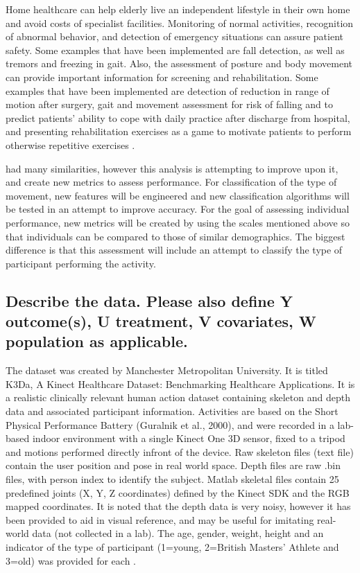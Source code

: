 \documentclass[twoside,11pt]{article}
\begin{document}
 	Home healthcare can help elderly live an independent lifestyle in their own home and avoid costs of specialist facilities.	Monitoring of normal activities, recognition of abnormal behavior, and detection of emergency situations can assure patient safety. Some examples that have been implemented are fall detection, as well as tremors and freezing in gait. Also, the assessment of posture and body movement can provide important information for screening and rehabilitation. Some examples that have been implemented are detection of reduction in range of motion after surgery, gait and movement assessment for risk of falling and to predict patients' ability to cope with daily practice after discharge from hospital, and presenting rehabilitation exercises as a game to motivate patients to perform otherwise repetitive exercises \citep{cite1}. 
 	
  \citep{cite1} had many similarities, however this analysis is attempting to improve upon it, and create new metrics to assess performance. For classification of the type of movement, new features will be engineered and new classification algorithms will be tested in an attempt to improve accuracy. For the goal of assessing individual performance, new metrics will be created by using the scales mentioned above so that individuals can be compared to those of similar demographics. The biggest difference is that this assessment will include an attempt to classify the type of participant performing the activity.

\subsection{Describe the data. Please also define Y outcome(s), U treatment, V covariates, W population as applicable.}

  The dataset was created by Manchester Metropolitan University. It is titled K3Da, A Kinect Healthcare Dataset: Benchmarking Healthcare Applications. It is a realistic clinically relevant human action dataset containing skeleton and depth data and associated participant information. Activities are based on the Short Physical Performance Battery (Guralnik et al., 2000), and were recorded in a lab-based indoor environment with a single Kinect One 3D sensor, fixed to a tripod and motions performed directly infront of the device. Raw skeleton files (text file) contain the user position and pose in real world space. Depth files are raw .bin files, with person index to identify the subject. Matlab skeletal files contain 25 predefined joints (X, Y, Z coordinates) defined by the Kinect SDK and the RGB mapped coordinates. It is noted that the depth data is very noisy, however it has been provided to aid in visual reference, and may be useful for imitating real-world data (not collected in a lab). The age, gender, weight, height and an indicator of the type of participant (1=young, 2=British Masters' Athlete and 3=old) was provided for each \citep{cite1}.
\end{document}
